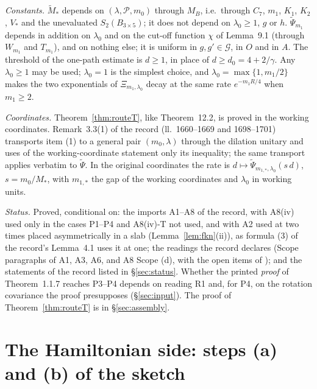 \documentclass[11pt,a4paper]{article}
\newcommand{\G}{\mathcal{G}}
\newcommand{\Mt}{\widetilde M}                %
\newcommand{\Psit}{\widetilde\Psi}
\theoremstyle{plain}
\theoremstyle{definition}
\begin{document}
\emph{Constants.}  $\Mt_*$ depends on $(\lambda,\mathscr P,m_0)$ through $M_B$, i.e.\ through
$C_7$, $m_1$, $K_1$, $K_2$, $V_*$ and the unevaluated $S_2(B_{3\times5})$; it does not depend on
$\lambda_0\ge1$, $g$ or $h$.  $\Psit_{m_1}$ depends in addition on $\lambda_0$ and on the
cut-off function $\chi$ of Lemma~9.1 (through $W_{m_1}$ and $T_{m_1}$), and on nothing else; it
is uniform in $g,g'\in\G$, in $O$ and in $A$.  The threshold of the one-path estimate is
$d\ge1$, in place of $d\ge d_0=4+2/\gamma$.  Any $\lambda_0\ge1$ may be used; $\lambda_0=1$ is
the simplest choice, and $\lambda_0=\max\{1,m_1/2\}$ makes the two exponentials of
$\Xi_{m_1,\lambda_0}$ decay at the same rate $e^{-m_1R/4}$ when $m_1\ge2$.

\emph{Coordinates.}  Theorem~\ref{thm:routeT}, like Theorem~12.2, is proved in the working
coordinates.  Remark~3.3(1) of the record (ll.~1660--1669 and 1698--1701) transports item (1)
to a general pair $(m_0,\lambda)$ through the dilation unitary and uses of the
working-coordinate statement only its inequality; the same transport applies verbatim to
$\Psit$.  In the original coordinates the rate is $d\mapsto\Psit_{m_{1,*},\lambda_0}(s\,d)$,
$s=m_0/M_*$, with $m_{1,*}$ the gap of the working coordinates and $\lambda_0$ in working units.

\emph{Status.}  Proved, conditional on: the imports A1--A8 of the record, with A8(iv) used only
in the cases P1--P4 and A8(iv)-T not used, and with A2 used at two times placed asymmetrically
in a slab (Lemma~\ref{lem:fkn}(ii)), as formula (3) of the record's Lemma~4.1 uses it at one; the readings
the record declares (Scope paragraphs of A1, A3, A6, and A8 Scope (d), with the open items of
); and the statements of the record listed in
\S\ref{sec:status}.  Whether the printed \emph{proof} of Theorem~1.1.7 reaches P3--P4 depends
on reading R1 and, for P4, on the rotation covariance the proof presupposes
(\S\ref{sec:input}).  The proof of Theorem~\ref{thm:routeT} is in \S\ref{sec:assembly}.

\section{The Hamiltonian side: steps (a) and (b) of the sketch}\label{sec:hamiltonian}
\end{document}
